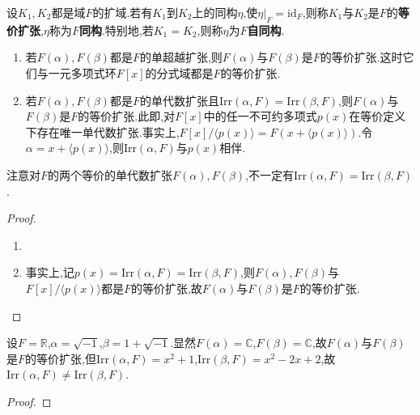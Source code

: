 \documentclass[../../main.tex]{subfiles}%
\begin{document}
\begin{definition}
设$K_1,K_2$都是域$F$的扩域.若有$K_1$到$K_2$上的同构$\eta$,使$\eta|_F=\mathrm{id}_F$,则称$K_1$与$K_2$是$F$的\textbf{等价扩张},$\eta$称为\textbf{$F$同构}.特别地,若$K_1=K_2$,则称$\eta$为$F$\textbf{自同构}.
\end{definition}

\begin{proposition}\label{proposition:等价扩张的基本结论--抽象代数}
\begin{enumerate}[(1)]
\item\label{proposition:等价扩张的基本结论--抽象代数-1} 若$F(\alpha),F(\beta)$都是$F$的单超越扩张,则$F(\alpha)$与$F(\beta)$是$F$的等价扩张.这时它们与一元多项式环$F[x]$的分式域都是$F$的等价扩张.

\item\label{proposition:等价扩张的基本结论--抽象代数-2} 若$F(\alpha),F(\beta)$都是$F$的单代数扩张且$\mathrm{Irr}(\alpha,F)=\mathrm{Irr}(\beta,F)$,则$F(\alpha)$与$F(\beta)$是$F$的等价扩张.此即,对$F[x]$中的任一不可约多项式$p(x)$在等价定义下存在唯一单代数扩张.事实上,$F[x]/\langle p(x)\rangle=F(x+\langle p(x)\rangle)$.令$\alpha=x+\langle p(x)\rangle$,则$\mathrm{Irr}(\alpha,F)$与$p(x)$相伴.
\end{enumerate}
\end{proposition}
\begin{remark}
注意对$F$的两个等价的单代数扩张$F(\alpha),F(\beta)$,不一定有$\mathrm{Irr}(\alpha,F)=\mathrm{Irr}(\beta,F)$.
\end{remark}
\begin{proof}
\begin{enumerate}[(1)]
\item 

\item 事实上,记$p(x)=\mathrm{Irr}(\alpha,F)=\mathrm{Irr}(\beta,F)$,则$F(\alpha),F(\beta)$与$F[x]/\langle p(x)\rangle$都是$F$的等价扩张,故$F(\alpha)$与$F(\beta)$是$F$的等价扩张.
\end{enumerate}

\end{proof}

\begin{example}\label{example:抽象代数--例题3.1.3}
设$F=\mathbb{R}$,$\alpha=\sqrt{-1}$,$\beta=1+\sqrt{-1}$.显然$F(\alpha)=\mathbb{C}$,$F(\beta)=\mathbb{C}$,故$F(\alpha)$与$F(\beta)$是$F$的等价扩张,但$\mathrm{Irr}(\alpha,F)=x^2+1$,$\mathrm{Irr}(\beta,F)=x^2-2x+2$,故$\mathrm{Irr}(\alpha,F)\neq\mathrm{Irr}(\beta,F)$.
\end{example}
\begin{proof}



\end{proof}
\end{document}
